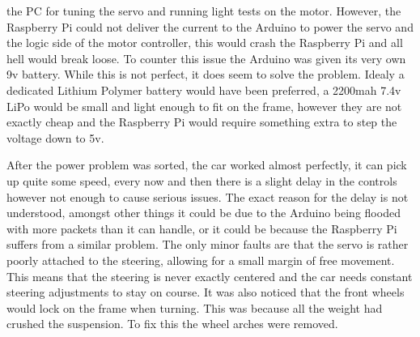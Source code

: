 the PC for tuning the servo and running light tests on the motor. However, the Raspberry Pi
could not deliver the current to the Arduino to power the servo and the logic side of the
motor controller, this would crash the Raspberry Pi and all hell would break loose.
To counter this issue the Arduino was given its very own 9v battery. While this is not
perfect, it does seem to solve the problem. Idealy a dedicated Lithium Polymer
battery would have been preferred, a 2200mah 7.4v LiPo would be small and light enough
to fit on the frame, however they are not exactly cheap and the Raspberry Pi would require
something extra to step the voltage down to 5v.
\par
After the power problem was sorted, the car worked almost perfectly, it can pick up quite
some speed, every now and then there is a slight delay in the controls however not enough
to cause serious issues. The exact reason for the delay is not understood, amongst other things
it could be due to the Arduino being flooded with more packets than it can handle, or it
could be because the Raspberry Pi suffers from a similar problem. The only minor faults are
that the servo is rather poorly attached to the steering, allowing for a small margin of
free movement. This means that the steering is never exactly centered and the car needs
constant steering adjustments to stay on course. It was also noticed that the front wheels
would lock on the frame when turning. This was because all the weight had crushed the suspension.
To fix this the wheel arches were removed.
